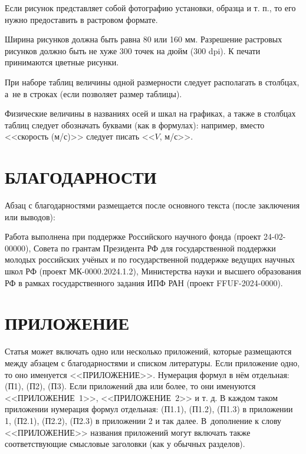 \documentclass[12pt, a4paper]{article}
\begin{document}
Если рисунок представляет собой фотографию установки, образца и т. п., то его нужно предоставить в растровом формате.

Ширина рисунков должна быть равна 80 или 160 мм. Разрешение растровых рисунков должно быть не хуже 300 точек на дюйм (300 dpi). К печати принимаются цветные рисунки.

При наборе таблиц величины одной размерности следует располагать в столбцах, а~не в строках (если позволяет размер таблицы).

Физические величины в названиях осей и шкал на графиках, а также в столбцах таблиц следует обозначать буквами (как в формулах): например, вместо <<скорость (м/с)>> следует писать <<$V$, м/с>>.

\section{БЛАГОДАРНОСТИ}

Абзац с благодарностями размещается после основного текста (после заключения или выводов):

Работа выполнена при поддержке Российского научного фонда (проект 24-02-00000), Совета по грантам Президента РФ для государственной поддержки молодых российских учёных и по государственной поддержке ведущих научных школ РФ (проект МК-0000.2024.1.2), Министерства науки и высшего образования РФ в рамках государственного задания ИПФ РАН (проект FFUF-2024-0000).

\section*{\hfill ПРИЛОЖЕНИЕ}

Статья может включать одно или несколько приложений, которые размещаются между абзацем с благодарностями и списком литературы. Если приложение одно, то оно именуется <<ПРИЛОЖЕНИЕ>>. Нумерация формул в нём отдельная: (П1), (П2), (П3). Если приложений два или более, то они именуются <<ПРИЛОЖЕНИЕ~1>>, <<ПРИЛОЖЕНИЕ~2>> и т. д. В каждом таком приложении нумерация формул отдельная: (П1.1), (П1.2), (П1.3) в приложении 1, (П2.1), (П2.2), (П2.3) в приложении 2 и так далее. В~дополнение к слову <<ПРИЛОЖЕНИЕ>> названия приложений могут включать также соответствующие смысловые заголовки (как у обычных разделов).
\end{document}
